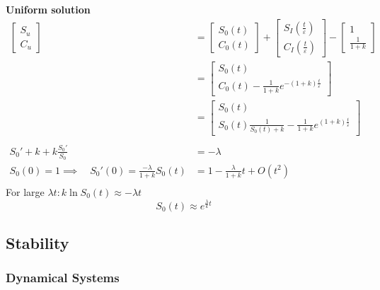 \documentclass{article}
\theoremstyle{remark}
\begin{document}
\textbf{ Uniform solution }   \[
  \begin{split}
\begin{bmatrix} 
  S_{u} \\
  C_{u} 
\end{bmatrix} 
 & = 
\begin{bmatrix} 
S_{0} \left( t \right) \\
C_{0} \left( t \right) 
\end{bmatrix} 
+ 
\begin{bmatrix} 
S_{I} \left( \frac{t}{\varepsilon } \right)  \\
C_{I} \left( \frac{t}{\varepsilon }  \right)
\end{bmatrix} 
- \begin{bmatrix} 
1 \\
\frac{1}{1+ k}
\end{bmatrix}  \\
&=   \begin{bmatrix} 
S_{0} \left( t \right)  \\
C_{0} \left( t \right) - \frac{1}{1+k} e^{-\left( 1+ k \right) \frac{t}{\varepsilon }}
\end{bmatrix} 
  \\
  &=  \begin{bmatrix} 
  S_{0} \left( t \right) \\
S_{0} \left( t \right) \frac{1}{ S_{0} \left( t \right) + k}  - \frac{1}{1+k} e^{\left( 1 + k \right) \frac{t}{\varepsilon }}
  \end{bmatrix} 
   \\
   \\
   S_{0}'  + k + k \frac{S_{0} ' }{ S_{0}} &=  - \lambda  \\ 
   S_{0} \left( 0 \right) = 1 \implies  \quad  S_{0}' \left( 0 \right) = \frac{-\lambda }{1+k}  
   S_{0} \left( t \right) &=  1 - \frac{\lambda  }{ 1+ k}  t + O\left( t^2 \right) \\
  \end{split} 
\] 
For large $\lambda t : k \ln S_{0}\left( t \right) \approx - \lambda  t$  \[
S_{0}\left( t \right) \approx e ^{ \frac{\lambda}{ k} t}
\] 



\subsection{Stability}%
\label{sub:hehehe}


\subsubsection{Dynamical Systems}%
\label{ssub:dynamical_systems}
\end{document}
